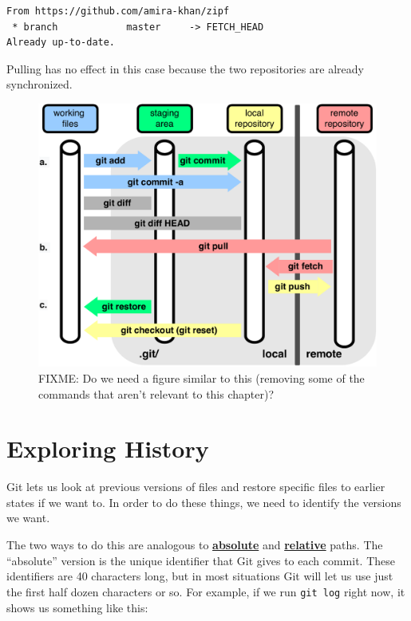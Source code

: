 \documentclass[
]{krantz}
\newcommand{\gref}[2]{\hyperlink{#2}{\textbf{#1}}}
\begin{document}
\begin{verbatim}
From https://github.com/amira-khan/zipf
 * branch            master     -> FETCH_HEAD
Already up-to-date.
\end{verbatim}

Pulling has no effect in this case
because the two repositories are already synchronized.

\begin{figure}

{\centering \includegraphics[width=1\linewidth]{figures/git-cmdline/git-remote} 

}

\caption{FIXME: Do we need a figure similar to this (removing some of the commands that aren't relevant to this chapter)?}\label{fig:git-cmdline-remote}
\end{figure}

\hypertarget{git-cmdline-history}{%
\section{Exploring History}\label{git-cmdline-history}}

Git lets us look at previous versions of files
and restore specific files to earlier states if we want to.
In order to do these things,
we need to identify the versions we want.

The two ways to do this
are analogous to \gref{absolute}{absolute\_path} and \gref{relative}{relative\_path} paths.
The ``absolute'' version is the unique identifier that Git gives to each commit.
These identifiers are 40 characters long,
but in most situations Git will let us use just the first half dozen characters or so.
For example,
if we run \texttt{git\ log} right now,
it shows us something like this:
\end{document}
